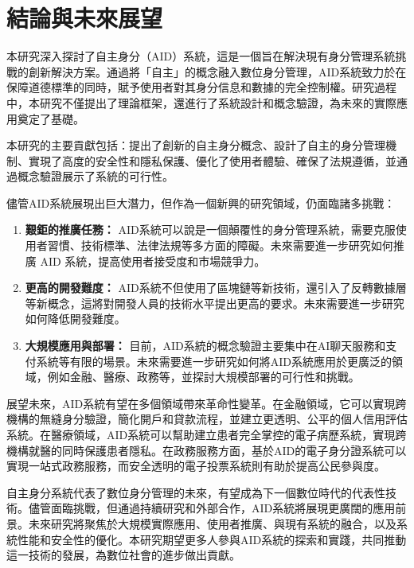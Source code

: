 
\chapter{結論與未來展望}
本研究深入探討了自主身分（AID）系統，這是一個旨在解決現有身分管理系統挑戰的創新解決方案。通過將「自主」的概念融入數位身分管理，AID系統致力於在保障道德標準的同時，賦予使用者對其身分信息和數據的完全控制權。研究過程中，本研究不僅提出了理論框架，還進行了系統設計和概念驗證，為未來的實際應用奠定了基礎。

本研究的主要貢獻包括：提出了創新的自主身分概念、設計了自主的身分管理機制、實現了高度的安全性和隱私保護、優化了使用者體驗、確保了法規遵循，並通過概念驗證展示了系統的可行性。

儘管AID系統展現出巨大潛力，但作為一個新興的研究領域，仍面臨諸多挑戰：
\begin{enumerate}
    \item \textbf{艱鉅的推廣任務：} AID系統可以說是一個顛覆性的身分管理系統，需要克服使用者習慣、技術標準、法律法規等多方面的障礙。未來需要進一步研究如何推廣 AID 系統，提高使用者接受度和市場競爭力。
    \item \textbf{更高的開發難度：} AID系統不但使用了區塊鏈等新技術，還引入了反轉數據層等新概念，這將對開發人員的技術水平提出更高的要求。未來需要進一步研究如何降低開發難度。
    \item \textbf{大規模應用與部署：} 目前，AID系統的概念驗證主要集中在AI聊天服務和支付系統等有限的場景。未來需要進一步研究如何將AID系統應用於更廣泛的領域，例如金融、醫療、政務等，並探討大規模部署的可行性和挑戰。
\end{enumerate}

展望未來，AID系統有望在多個領域帶來革命性變革。在金融領域，它可以實現跨機構的無縫身分驗證，簡化開戶和貸款流程，並建立更透明、公平的個人信用評估系統。在醫療領域，AID系統可以幫助建立患者完全掌控的電子病歷系統，實現跨機構就醫的同時保護患者隱私。在政務服務方面，基於AID的電子身分證系統可以實現一站式政務服務，而安全透明的電子投票系統則有助於提高公民參與度。

自主身分系統代表了數位身分管理的未來，有望成為下一個數位時代的代表性技術。儘管面臨挑戰，但通過持續研究和外部合作，AID系統將展現更廣闊的應用前景。未來研究將聚焦於大規模實際應用、使用者推廣、與現有系統的融合，以及系統性能和安全性的優化。本研究期望更多人參與AID系統的探索和實踐，共同推動這一技術的發展，為數位社會的進步做出貢獻。